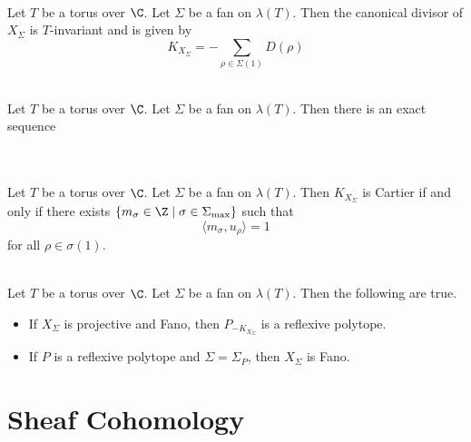 \documentclass[a4paper]{article}
\begin{document}
\begin{crl}{}{}\\
Let $T$ be a torus over $\C$. Let $\Sigma$ be a fan on $\lambda(T)$. Then the canonical divisor of $X_\Sigma$ is $T$-invariant and is given by $$K_{X_\Sigma}=-\sum_{\rho\in\Sigma(1)}D(\rho)$$
\end{crl}

\begin{prp}{}{}\\
Let $T$ be a torus over $\C$. Let $\Sigma$ be a fan on $\lambda(T)$. Then there is an exact sequence \\
\\
\end{prp}

\begin{prp}{}{}\\
Let $T$ be a torus over $\C$. Let $\Sigma$ be a fan on $\lambda(T)$. Then $K_{X_\Sigma}$ is Cartier if and only if there exists $\{m_\sigma\in\Z\;|\;\sigma\in\Sigma_{\max}\}$ such that $$\langle m_\sigma,u_\rho\rangle=1$$ for all $\rho\in\sigma(1)$. 
\end{prp}

\begin{prp}{}{}\\
Let $T$ be a torus over $\C$. Let $\Sigma$ be a fan on $\lambda(T)$. Then the following are true. 
\begin{itemize}
\item If $X_\Sigma$ is projective and Fano, then $P_{-K_{X_\Sigma}}$ is a reflexive polytope. 
\item If $P$ is a reflexive polytope and $\Sigma=\Sigma_P$, then $X_\Sigma$ is Fano. 
\end{itemize}
\end{prp}


\pagebreak
\section{Sheaf Cohomology}
\end{document}
